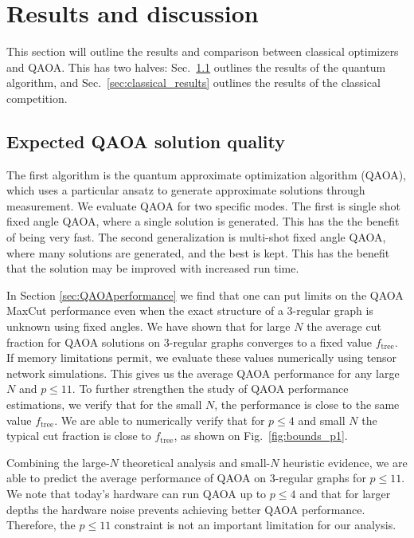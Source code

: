 \section{Results and discussion}

This section will outline the results and comparison between classical optimizers and QAOA. This has two halves: Sec.~\ref{sec:QAOA_results} outlines the results of the quantum algorithm, and Sec.~\ref{sec:classical_results} outlines the results of the classical competition.

\label{sec:results}




\subsection{Expected QAOA solution quality}\label{sec:QAOA_results}

The first algorithm is the quantum approximate optimization algorithm (QAOA), which uses a particular ansatz to generate approximate solutions through measurement.  We evaluate QAOA for two specific modes. The first is single shot fixed angle QAOA, where a single solution is generated. This has the the benefit of being very fast. The second generalization is multi-shot fixed angle QAOA, where many solutions are generated, and the best is kept. This has the benefit that the solution may be improved with increased run time.

In Section \ref{sec:QAOAperformance} we find that one can put limits on the QAOA MaxCut performance even when the exact structure of a 3-regular graph is unknown using fixed angles. We have shown that for large $N$ the average cut fraction for QAOA solutions on 3-regular graphs converges to a fixed value $f_{\text {tree}}$. If memory limitations permit, we evaluate these values numerically using tensor network simulations. This gives us the average QAOA performance for any large $N$ and $p\leq11$.  To further strengthen the study of QAOA performance estimations, we verify that for the small $N$, the performance is close to the same value $f_{\text{tree}}$. We are able to numerically verify that for $p\leq 4$ and small $N$ the typical cut fraction is close to $f_{\text {tree}}$, as shown on Fig.~\ref{fig:bounds_p1}.

Combining the large-$N$ theoretical analysis and small-$N$ heuristic evidence, we are able to predict the average performance of QAOA on 3-regular graphs for $p\leq11$. We note that today's hardware can run QAOA up to $p\leq4$ \cite{ebadi2022} and that for larger depths the hardware noise prevents achieving better QAOA performance. Therefore, the $p\leq11$ constraint is not an important limitation for our analysis.

